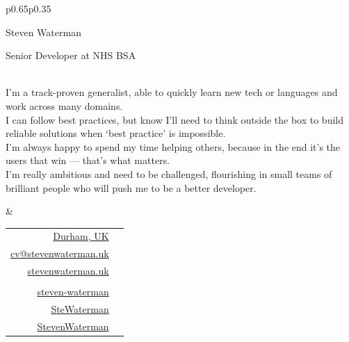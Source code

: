 \documentclass[hidelinks, 12pt, a4paper]{article}
\begin{document}
	\begin{tabular}{p{0.65\textwidth}p{0.35\textwidth}}
		\begin{minipage}{\linewidth}
			\begin{Huge}Steven Waterman\end{Huge}
			
			\hspace{24pt}\begin{large}Senior Developer at NHS BSA\end{large}\\
			
			I'm a track-proven generalist, able to quickly learn new tech or languages and work across many domains.\\
			
			I can follow best practices, but know I'll need to think outside the box to build reliable solutions when `best practice' is impossible.\\
			
			I'm always happy to spend my time helping others, because in the end it's the users that win --- that's what matters.\\
			
			I'm really ambitious and need to be challenged, flourishing in small teams of brilliant people who will push me to be a better developer.
		\end{minipage} & \vspace{-40pt}\begin{minipage}{\linewidth}
			\begin{flushright}
				\begin{tabular}{rc}
					\href{https://en.wikipedia.org/wiki/Durham,_England}{Durham, UK} & \href{https://en.wikipedia.org/wiki/Durham,_England}{\faHome} \\
					\href{mailto:cv@stevenwaterman.uk}{cv@stevenwaterman.uk} & \href{mailto:cv@stevenwaterman.uk}{\faEnvelope} \\
					\href{http://www.stevenwaterman.uk}{stevenwaterman.uk} & \href{http://www.stevenwaterman.uk}{\faLink} \\
					&\\
					\href{https://www.linkedin.com/in/steven-waterman/}{steven-waterman} & \href{https://www.linkedin.com/in/steven-waterman/}{\faLinkedin} \\
					\href{https://twitter.com/SteWaterman}{SteWaterman} & \href{https://twitter.com/SteWaterman}{\faTwitter} \\
					\href{https://github.com/stevenwaterman}{StevenWaterman} & \href{https://github.com/stevenwaterman}{\faGithub}
				\end{tabular}
			\end{flushright}
		\end{minipage}
	\end{tabular}
\end{document}
